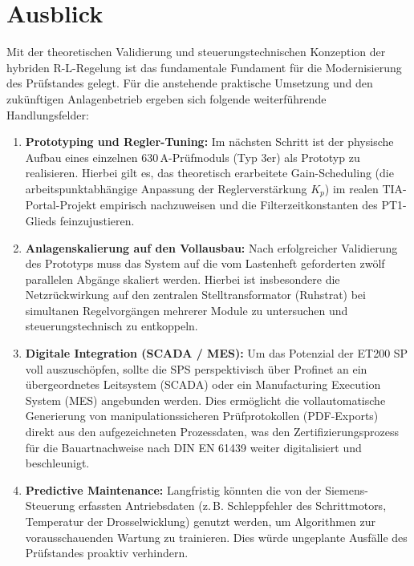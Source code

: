 
\section{Ausblick}
\label{chap:ausblick}

Mit der theoretischen Validierung und steuerungstechnischen Konzeption der hybriden R-L-Regelung ist das fundamentale Fundament für die Modernisierung des Prüfstandes gelegt. Für die anstehende praktische Umsetzung und den zukünftigen Anlagenbetrieb ergeben sich folgende weiterführende Handlungsfelder:

\begin{enumerate}
    \item \textbf{Prototyping und Regler-Tuning:} Im nächsten Schritt ist der physische Aufbau eines einzelnen 630\,A-Prüfmoduls (Typ 3er) als Prototyp zu realisieren. Hierbei gilt es, das theoretisch erarbeitete Gain-Scheduling (die arbeitspunktabhängige Anpassung der Reglerverstärkung $K_p$) im realen TIA-Portal-Projekt empirisch nachzuweisen und die Filterzeitkonstanten des PT1-Glieds feinzujustieren.
    
    \item \textbf{Anlagenskalierung auf den Vollausbau:} Nach erfolgreicher Validierung des Prototyps muss das System auf die vom Lastenheft geforderten zwölf parallelen Abgänge skaliert werden. Hierbei ist insbesondere die Netzrückwirkung auf den zentralen Stelltransformator (Ruhstrat) bei simultanen Regelvorgängen mehrerer Module zu untersuchen und steuerungstechnisch zu entkoppeln.
    
    \item \textbf{Digitale Integration (SCADA / MES):} Um das Potenzial der ET200 SP voll auszuschöpfen, sollte die SPS perspektivisch über Profinet an ein übergeordnetes Leitsystem (SCADA) oder ein Manufacturing Execution System (MES) angebunden werden. Dies ermöglicht die vollautomatische Generierung von manipulationssicheren Prüfprotokollen (PDF-Exports) direkt aus den aufgezeichneten Prozessdaten, was den Zertifizierungsprozess für die Bauartnachweise nach DIN EN 61439 weiter digitalisiert und beschleunigt.
    
    \item \textbf{Predictive Maintenance:} Langfristig könnten die von der Siemens-Steuerung erfassten Antriebsdaten (z.\,B. Schleppfehler des Schrittmotors, Temperatur der Drosselwicklung) genutzt werden, um Algorithmen zur vorausschauenden Wartung zu trainieren. Dies würde ungeplante Ausfälle des Prüfstandes proaktiv verhindern.
\end{enumerate}